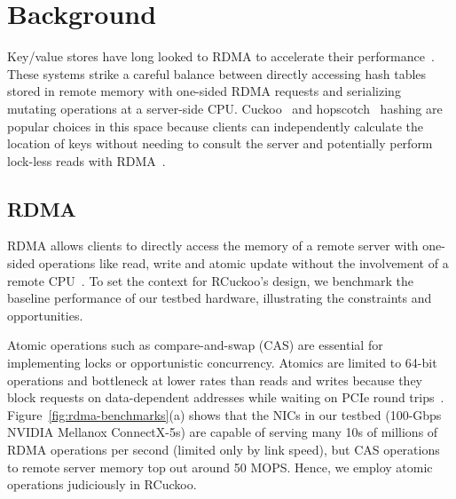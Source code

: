 
\section{Background}
\label{sec:background}



Key/value stores have long looked to RDMA to
accelerate their
performance~\cite{farm,memc3,erpc,herd,faast,mica,pilaf,cell,storm}.
These systems strike a careful balance between directly accessing hash
tables stored in remote memory with one-sided RDMA requests and
serializing mutating operations at a server-side CPU.
Cuckoo~\cite{cuckoo} and hopscotch~\cite{hopscotch} hashing are popular choices in
this space because clients can independently calculate the location of
keys without needing to consult the server and potentially perform
lock-less reads with RDMA~\cite{farm,pilaf,cuckoo}.



\subsection{RDMA}

RDMA
allows
clients to directly access the memory of a remote server with
one-sided operations like read, write and atomic update without the
involvement of a remote CPU~\cite{infiniband-spec}.  To set the
context for RCuckoo's design, we benchmark the baseline performance of
our testbed hardware, illustrating the constraints and
opportunities.

Atomic operations such as compare-and-swap (CAS) are essential for
implementing locks or opportunistic concurrency. Atomics are limited
to 64-bit operations and bottleneck at lower rates than reads and
writes because they block requests on data-dependent addresses while
waiting on PCIe round trips~\cite{design-guidelines,sherman}.
Figure~\ref{fig:rdma-benchmarks}(a) shows that the NICs in our testbed
(100-Gbps NVIDIA Mellanox ConnectX-5s) are capable of serving many 10s of
millions of RDMA operations per second (limited only by link speed),
but CAS operations to remote server memory top out around 50 MOPS.  Hence, we employ atomic operations judiciously in RCuckoo.

